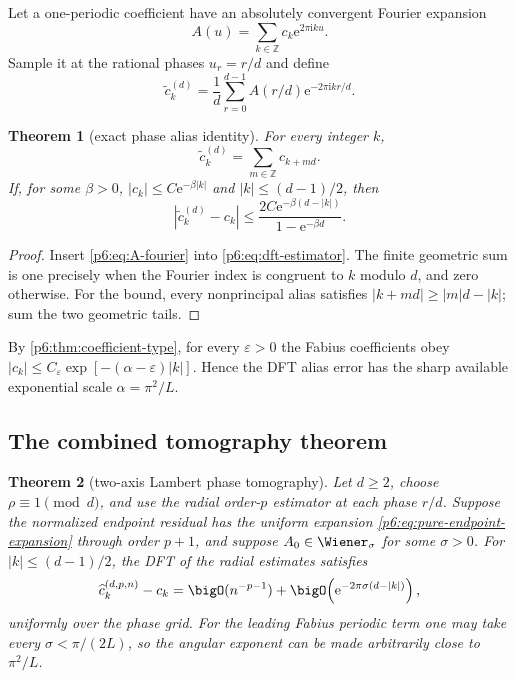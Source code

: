 \documentclass[11pt]{article}
\numberwithin{equation}{section}
\newtheorem{theorem}{Theorem}[section]
\theoremstyle{definition}
\theoremstyle{remark}
\newcommand{\Z}{\mathbb Z}
\newcommand{\e}{\mathrm e}
\newcommand{\ii}{\mathrm i}
\begin{document}
Let a one-periodic coefficient have an absolutely convergent Fourier expansion
\begin{equation}
 A(u)=\sum_{k\in\Z}c_k\e^{2\pi\ii ku}.
 \label{p6:eq:A-fourier}
\end{equation}
Sample it at the rational phases $u_r=r/d$ and define
\begin{equation}
 \widetilde c_k^{(d)}
 =\frac1d\sum_{r=0}^{d-1}A(r/d)\e^{-2\pi\ii kr/d}.
 \label{p6:eq:dft-estimator}
\end{equation}

\begin{theorem}[exact phase alias identity]
\label{p6:thm:phase-alias}
For every integer $k$,
\begin{equation}
 \boxed{\displaystyle
 \widetilde c_k^{(d)}=\sum_{m\in\Z}c_{k+md}.}
 \label{p6:eq:phase-alias}
\end{equation}
If, for some $\beta>0$, $|c_k|\le C\e^{-\beta|k|}$ and
$|k|\le(d-1)/2$, then
\begin{equation}
 |\widetilde c_k^{(d)}-c_k|
 \le\frac{2C\e^{-\beta(d-|k|)}}{1-\e^{-\beta d}}.
 \label{p6:eq:alias-bound}
\end{equation}
\end{theorem}

\begin{proof}
Insert \eqref{p6:eq:A-fourier} into \eqref{p6:eq:dft-estimator}.  The finite geometric
sum is one precisely when the Fourier index is congruent to $k$ modulo $d$, and zero
otherwise.  For the bound, every nonprincipal alias satisfies
$|k+md|\ge |m|d-|k|$; sum the two geometric tails.
\end{proof}

By \cref{p6:thm:coefficient-type}, for every $\varepsilon>0$ the Fabius coefficients obey
$|c_k|\le C_\varepsilon\exp[-(\alpha-\varepsilon)|k|]$.  Hence the DFT alias error has the
sharp available exponential scale $\alpha=\pi^2/L$.

\subsection{The combined tomography theorem}

\begin{theorem}[two-axis Lambert phase tomography]
\label{p6:thm:two-axis}
Let $d\ge2$, choose $\rho\equiv1\pmod d$, and use the radial order-$p$ estimator at each
phase $r/d$.  Suppose the normalized endpoint residual has the uniform expansion
\eqref{p6:eq:pure-endpoint-expansion} through order $p+1$, and suppose
$A_0\in\Wiener_\sigma$ for some $\sigma>0$.  For
$|k|\le(d-1)/2$, the DFT of the radial estimates satisfies
\begin{equation}
 \widehat c_{k}^{(d,p,n)}-c_k
 =\bigO(n^{-p-1})
 +\bigO\!\left(\e^{-2\pi\sigma(d-|k|)}\right),
 \label{p6:eq:two-axis-error}
\end{equation}
uniformly over the phase grid.  For the leading Fabius periodic term one may take every
$\sigma<\pi/(2L)$, so the angular exponent can be made arbitrarily close to
$\pi^2/L$.
\end{theorem}
\end{document}
